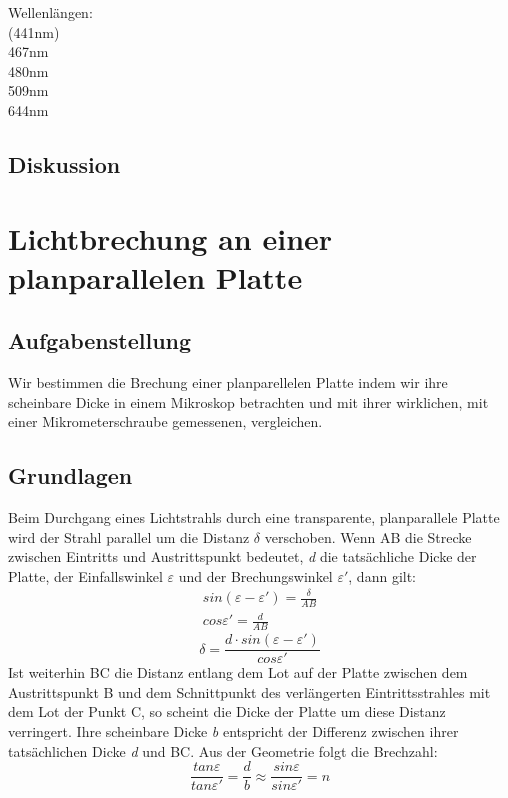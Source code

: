 \documentclass{article}
\begin{document}
Wellenlängen:\\
(441nm)\\
467nm\\
480nm\\
509nm\\
644nm\\

\subsection{Diskussion}

\section{Lichtbrechung an einer planparallelen Platte}

\subsection{Aufgabenstellung}
Wir bestimmen die Brechung einer planparellelen Platte indem wir ihre scheinbare Dicke in einem Mikroskop betrachten und mit ihrer wirklichen, mit einer Mikrometerschraube gemessenen, vergleichen.
\subsection{Grundlagen}
Beim Durchgang eines Lichtstrahls durch eine transparente, planparallele Platte wird der Strahl parallel um die Distanz $\delta$ verschoben. Wenn AB die Strecke zwischen Eintritts und Austrittspunkt bedeutet, \textit{d} die tatsächliche Dicke der Platte, der Einfallswinkel $\varepsilon$ und der Brechungswinkel $\varepsilon '$, dann gilt:
\begin{gather*}
sin(\varepsilon-\varepsilon ') = \frac{\delta}{AB} \\
cos \varepsilon ' = \frac{d}{AB}  
\end{gather*}
\begin{equation}
\label{distanzdelta}
\delta =\frac{d\cdot sin(\varepsilon - \varepsilon ')}{cos\varepsilon '}
\end{equation}
Ist weiterhin BC die Distanz entlang dem Lot auf der Platte zwischen dem Austrittspunkt B und dem Schnittpunkt des verlängerten Eintrittsstrahles mit dem Lot der Punkt C, so scheint die Dicke der Platte um diese Distanz verringert. Ihre scheinbare Dicke \textit{b} entspricht der Differenz zwischen ihrer tatsächlichen Dicke \textit{d} und BC. Aus der Geometrie folgt die Brechzahl: 
\begin{equation}
\label{brechzahlplatte}
\frac{tan\varepsilon}{tan\varepsilon '}=\frac{d}{b}\approx\frac{sin\varepsilon}{sin\varepsilon '} = n
\end{equation}
\end{document}
